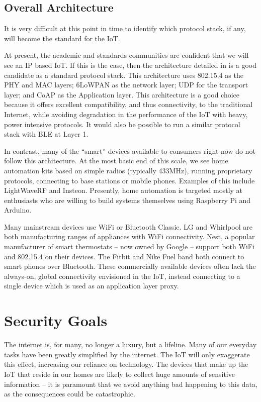 \documentclass[10pt,journal,compsoc]{IEEEtran}
\begin{document}
\subsection{Overall Architecture}
It is very difficult at this point in time to identify which protocol stack, if
any, will become the standard for the IoT. 

At present, the academic and standards communities are confident that we will
see an IP based IoT. If this is the case, then the architecture detailed in
\cite{Palattella2013} is a good candidate as a standard protocol stack. This
architecture uses 802.15.4 as the PHY and MAC layers; 6LoWPAN as the network
layer; UDP for the transport layer; and CoAP as the Application layer. This
architecture is a good choice because it offers excellent compatibility, and
thus connectivity, to the traditional Internet, while avoiding degradation in
the performance of the IoT with heavy, power intensive protocols. It would also
be possible to run a similar protocol stack with BLE at Layer 1.  

In contrast, many of the ``smart'' devices available to consumers right now do
not follow this architecture. At the most basic end of this scale, we see home
automation kits based on simple radios (typically 433MHz), running proprietary
protocols, connecting to base stations or mobile phones. Examples of this
include LightWaveRF and Insteon. Presently, home automation is targeted mostly
at enthusiasts who are willing to build systems themselves using Raspberry Pi
and Arduino.  

Many mainstream devices use WiFi or Bluetooth Classic. LG and Whirlpool are
both manufacturing ranges of appliances with WiFi connectivity. Nest, a popular
manufacturer of smart thermostats -- now owned by Google -- support both WiFi
and 802.15.4 on their devices. The Fitbit and Nike Fuel band both connect to
smart phones over Bluetooth. These commercially available devices often lack
the always-on,  global connectivity envisioned in the IoT, instead connecting
to a single device which is used as an application layer proxy.

\section{Security Goals}
The internet is, for many, no longer a luxury, but a lifeline. Many of our
everyday tasks have been greatly simplified by the internet. The IoT will only
exaggerate this effect, increasing our reliance on technology. The devices that
make up the IoT that reside in our homes are likely to collect huge amounts of
sensitive information -- it is paramount that we avoid anything bad happening to
this data, as the consequences could be catastrophic. 
\end{document}
